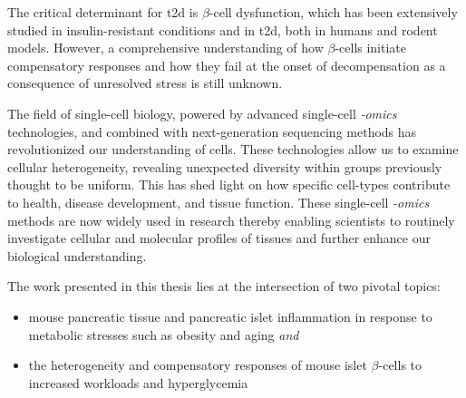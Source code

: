  The critical determinant for \gls{t2d} is $\beta$-cell dysfunction, which has been extensively studied in insulin-resistant conditions and in \gls{t2d}, both in humans and rodent models. However, a comprehensive understanding of how $\beta$-cells initiate compensatory responses and how they fail at the onset of decompensation as a consequence of unresolved stress is still unknown.\\
 \par The field of single-cell biology, powered by advanced single-cell \textit{-omics} technologies, and combined with next-generation sequencing methods has revolutionized our understanding of cells. These technologies allow us to examine cellular heterogeneity, revealing unexpected diversity within groups previously thought to be uniform. This has shed light on how specific cell-types contribute to health, disease development, and tissue function. These single-cell \textit{-omics} methods are now widely used in research thereby enabling scientists to routinely investigate cellular and molecular profiles of tissues and further enhance our biological understanding.\\
 



\par The work presented in this thesis lies at the intersection of two pivotal topics: 
\begin{itemize}
    \item mouse pancreatic tissue and pancreatic islet inflammation in response to metabolic stresses such as obesity and aging \textit{and}
    \item the heterogeneity and compensatory responses of mouse islet $\beta$-cells to increased workloads and hyperglycemia\\
\end{itemize}

